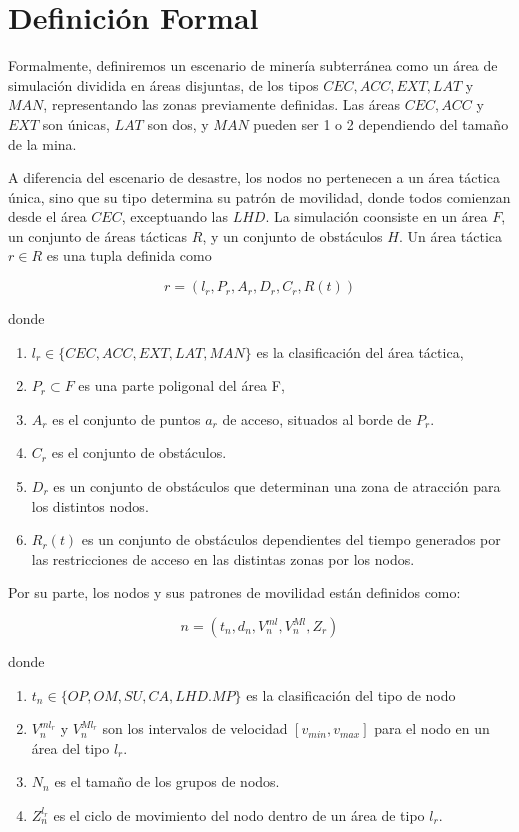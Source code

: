 \documentclass[10pt,preprint,onecolumn]{article}
\begin{document}
\newpage
\section{Definición Formal}

Formalmente, definiremos un escenario de minería subterránea como un área de simulación dividida en áreas disjuntas, de los tipos $CEC, ACC, EXT, LAT$ y $MAN$, representando las zonas previamente definidas. Las áreas $CEC, ACC$ y $EXT$ son únicas, $LAT$ son dos, y $MAN$ pueden ser 1 o 2 dependiendo del tamaño de la mina.

A diferencia del escenario de desastre, los nodos no pertenecen a un área táctica única, sino que su tipo determina su patrón de movilidad, donde todos comienzan desde el área $CEC$, exceptuando las $LHD$.
La simulación coonsiste en un área $F$, un conjunto de áreas tácticas $R$, y un conjunto de obstáculos $H$. Un área táctica $r \in R$ es una tupla definida como

$$ r = (l_r, P_r, A_r, D_r, C_r, R(t))$$

donde
\begin{enumerate}
\item $l_r \in \{CEC, ACC, EXT, LAT, MAN\}$ es la clasificación del área táctica,
\item $P_r \subset F$ es una parte poligonal del área F,
\item $A_r$ es el conjunto de puntos $a_r$ de acceso, situados al borde de $P_r$.
\item $C_r$ es el conjunto de obstáculos.
\item $D_r$ es un conjunto de obstáculos que determinan una zona de atracción para los distintos nodos.
\item $R_r(t)$ es un conjunto de obstáculos dependientes del tiempo generados por las restricciones de acceso en las distintas zonas por los nodos.
\end{enumerate}
Por su parte, los nodos y sus patrones de movilidad están definidos como:

$$ n = (t_n, d_n, V_n^{ml}, V_n^{Ml}, Z_r) $$

donde
\begin{enumerate}
\item $t_n \in \{OP, OM, SU, CA, LHD. MP\}$ es la clasificación del tipo de nodo
\item $V_n^{ml_r}$ y $V_n^{Ml_r}$ son los intervalos de velocidad $[v_{min}, v_{max}]$ para el nodo en un área del tipo $l_r$.
\item $N_n$ es el tamaño de los grupos de nodos.
\item $Z_n^{l_r}$ es el ciclo de movimiento del nodo dentro de un área de tipo $l_r$.

\end{enumerate}
\end{document}
